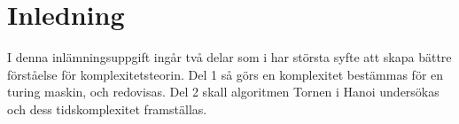 \section{Inledning}

I denna inlämningsuppgift ingår två delar som i har största syfte att skapa bättre förståelse för
komplexitetsteorin. Del 1 så görs en komplexitet bestämmas för en turing maskin, och redovisas.
Del 2 skall algoritmen Tornen i Hanoi undersökas och dess tidskomplexitet framställas.



